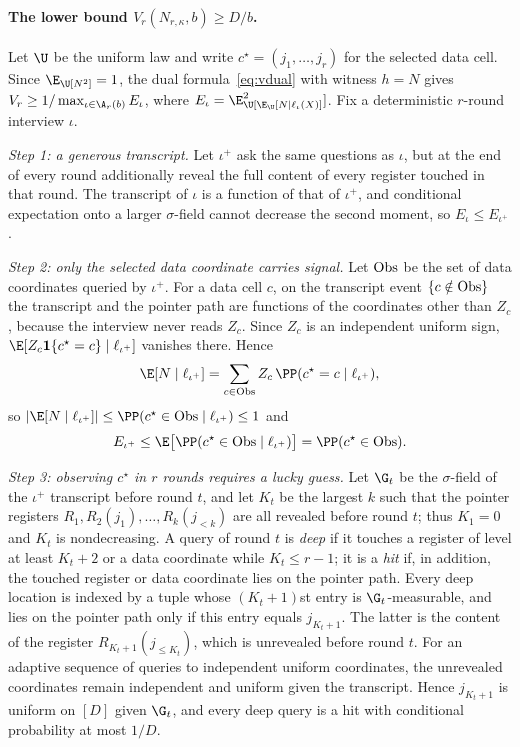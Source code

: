 \paragraph{The lower bound $V_r(N_{r,\kappa},b)\ge D/b$.}
Let $\U$ be the uniform law and write $c^\star=(j_1,\ldots,j_r)$ for the
selected data cell. Since $\E_\U[N^2]=1$, the dual formula~\eqref{eq:vdual}
with witness $h=N$ gives $V_r\ge1/\max_{\iota\in\A_r(b)}E_\iota$, where
$E_\iota=\E_\U[\E_\U[N\mid\ell_\iota(X)]^2]$. Fix a deterministic $r$-round
interview $\iota$.

\emph{Step 1: a generous transcript.}
Let $\iota^+$ ask the same questions as $\iota$, but at the end of every
round additionally reveal the full content of every register touched in that
round. The transcript of $\iota$ is a function of that of $\iota^+$, and
conditional expectation onto a larger $\sigma$-field cannot decrease the
second moment, so $E_\iota\le E_{\iota^+}$.

\emph{Step 2: only the selected data coordinate carries signal.}
Let ${\rm Obs}$ be the set of data coordinates queried by $\iota^+$. For a
data cell $c$, on the transcript event $\{c\notin{\rm Obs}\}$ the transcript
and the pointer path are functions of the coordinates other than $Z_c$,
because the interview never reads $Z_c$. Since $Z_c$ is an independent
uniform sign, $\E[Z_c\mathbf 1\{c^\star=c\}\mid\ell_{\iota^+}]$ vanishes there.
Hence
\[
 \E[N\mid\ell_{\iota^+}]=\sum_{c\in{\rm Obs}}Z_c\,\PP(c^\star=c\mid\ell_{\iota^+}),
\]
so $|\E[N\mid\ell_{\iota^+}]|\le\PP(c^\star\in{\rm Obs}\mid\ell_{\iota^+})\le1$ and
\[
 E_{\iota^+}\le\E\big[\PP(c^\star\in{\rm Obs}\mid\ell_{\iota^+})\big]
 =\PP(c^\star\in{\rm Obs}).
\]

\emph{Step 3: observing $c^\star$ in $r$ rounds requires a lucky guess.}
Let $\G_t$ be the $\sigma$-field of the $\iota^+$ transcript before round $t$,
and let $K_t$ be the largest $k$ such that the pointer registers
$R_1,R_2(j_1),\ldots,R_k(j_{<k})$ are all revealed before round $t$; thus
$K_1=0$ and $K_t$ is nondecreasing. A query of round $t$ is \emph{deep} if it
touches a register of level at least $K_t+2$ or a data coordinate while
$K_t\le r-1$; it is a \emph{hit} if, in addition, the touched register or
data coordinate lies on the pointer path. Every deep location is indexed by a
tuple whose $(K_t+1)$st entry is $\G_t$-measurable, and lies on the pointer
path only if this entry equals $j_{K_t+1}$. The latter is the content of the
register $R_{K_t+1}(j_{\le K_t})$, which is unrevealed before round $t$.
For an adaptive sequence of queries to independent uniform coordinates, the
unrevealed coordinates remain independent and uniform given the
transcript. Hence $j_{K_t+1}$ is uniform on $[D]$ given $\G_t$, and every deep
query is a hit with conditional probability at most $1/D$.

